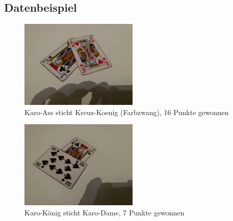 \documentclass[paper=A4, deutsch]{scrartcl}
\begin{document}
\subsection{Datenbeispiel}
\begin{figure}[h!]
 \centering
 \includegraphics[width=0.5\textwidth]{datenbeispiel.jpg}
 \caption{Karo-Ass sticht Kreuz-Koenig (Farbzwang), 16 Punkte gewonnen}
 \label{fig:img}
\end{figure}
\begin{figure}[h!]
 \centering
 \includegraphics[width=0.5\textwidth]{datenbeispiel2.jpg}
 \caption{Karo-K\"onig sticht Karo-Dame, 7 Punkte gewonnen}
 \label{fig:img}
\end{figure}

\newpage
\end{document}
